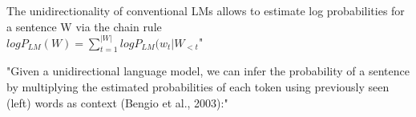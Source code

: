 The unidirectionality of conventional LMs allows to estimate log probabilities for a sentence W via the chain rule \citep{salazar2020masked} \\
$log P_{LM}(W) = \sum_{t=1}^{|W|} log P_{LM}(w_t | W_{<t}$" 

"Given a unidirectional language model, we can infer the probability of a sentence by multiplying the estimated probabilities of each token using
previously seen (left) words as context (Bengio et al., 2003):" \citep{lau2020furiously}







